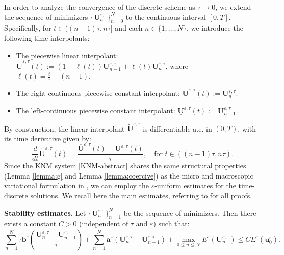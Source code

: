 \documentclass[a4paper,11pt]{article}
\theoremstyle{definition}
\numberwithin{equation}{section}
\newcommand{\e}{\varepsilon}
\begin{document}
In order to analyze the convergence of the discrete scheme as $\tau \to 0$, we extend the sequence of minimizers $\{\mathbf{U}_n^{\e,\tau}\}_{n=0}^N$ to the continuous interval $[0,T]$. Specifically, for $t \in ((n-1)\tau, n\tau]$ and each $n \in \{1, \dots, N\}$, we introduce the following time-interpolants:
\begin{itemize}
	\item The piecewise linear interpolant: $\widetilde{\mathbf{U}}^{\e, \tau}(t) := (1 - \ell(t))\mathbf{U}_{n-1}^{\e, \tau} + \ell(t)\mathbf{U}_n^{\e, \tau}$, where $ \ell(t) = \frac{t}{\tau} - (n-1)$.
	\item The right-continuous piecewise constant interpolant: $\overline{\mathbf{U}}^{\e, \tau}(t) := \mathbf{U}_n^{\e, \tau}.$
	\item The left-continuous piecewise constant interpolant: $\underline{\mathbf{U}}^{\e, \tau}(t) := \mathbf{U}_{n-1}^{\e, \tau}.$
\end{itemize}
By construction, the linear interpolant $\widetilde{\mathbf{U}}^{\e, \tau}$ is differentiable a.e. in $(0,T)$, with its time derivative given by:
\begin{equation*}\label{total-derivative-interpolants}
	\frac{d}{dt} \widetilde{\mathbf{U}}^{\e, \tau}(t) = \frac{\overline{\mathbf{U}}^{\e, \tau}(t) - \underline{\mathbf{U}}^{\e, \tau}(t)}{\tau}, \quad \text{for } t \in ((n-1)\tau, n\tau).
\end{equation*}
Since the KNM system \eqref{KNM-abstract} shares the same structural properties (Lemma \ref{lemma:g} and Lemma \ref{lemma:coercive}) as the micro and macroscopic variational formulation in \cite{PSCF05}, we can employ the $\e$-uniform estimates for the time-discrete solutions. We recall here the main estimates, referring to \cite[Section 5]{PSCF05} for all proofs.
\smallskip

\noindent \textbf{Stability estimates.} Let $\{\mathbf{U}_n^{\e,\tau}\}_{n=1}^N$ be the sequence of minimizers. Then there exists a constant $C > 0$ (independent of $\tau$ and $\e$) such that:
\begin{equation}
	\label{stability-estimate-knm}
	\sum_{n=1}^{N} \tau \mathbf{b}^\e\left(\frac{\mathbf{U}_n^{\e,\tau} - \mathbf{U}_{n-1}^{\e,\tau}}{\tau}\right) + \sum_{n=1}^{N} \mathbf{a}^\e(\mathbf{U}_n^{\e,\tau} - \mathbf{U}_{n-1}^{\e,\tau}) + \max_{0 \le n \le N} E^\e(\mathbf{U}_n^{\e,\tau}) \le C E^\e(\mathbf{u}_0^\e).
\end{equation}
\smallskip
\end{document}
